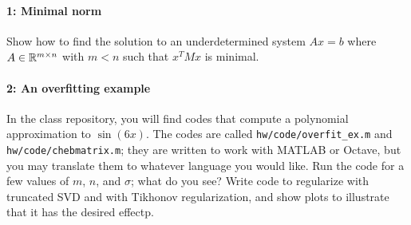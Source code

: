 \documentclass[12pt, leqno]{article} %
\begin{document}

\paragraph*{1: Minimal norm}
Show how to find the solution to an underdetermined system
$Ax = b$ where $A \in \mathbb{R}^{m \times n}$ with $m < n$ such
that $x^T M x$ is minimal.

\paragraph*{2: An overfitting example}
In the class repository, you will find codes that compute
a polynomial approximation to $\sin(6x)$.  The codes are called
{\tt hw/code/overfit\_ex.m} and {\tt hw/code/chebmatrix.m};
they are written to work with MATLAB or Octave, but you may
translate them to whatever language you would like.  Run the code
for a few values of $m$, $n$, and $\sigma$; what do you see?
Write code to regularize with truncated SVD and with Tikhonov
regularization, and show plots to illustrate that it has the
desired effectp.
\end{document}
